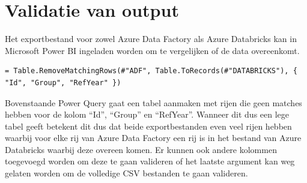 \section{Validatie van output}

Het exportbestand voor zowel Azure Data Factory als Azure Databricks kan in Microsoft Power BI ingeladen worden om te vergelijken of de data overeenkomt. 

\begin{lstlisting}[language={}, caption={Power Query voor het valideren van de output CSV bestanden.}, style=myStyle]
= Table.RemoveMatchingRows(#"ADF", Table.ToRecords(#"DATABRICKS"), { "Id", "Group", "RefYear" })
\end{lstlisting}

Bovenstaande Power Query gaat een tabel aanmaken met rijen die geen matches hebben voor de kolom ``Id'', ``Group'' en ``RefYear''. Wanneer dit dus een lege tabel geeft betekent dit dus dat beide exportbestanden even veel rijen hebben waarbij voor elke rij van Azure Data Factory een rij is in het bestand van Azure Databricks waarbij deze overeen komen. Er kunnen ook andere kolommen toegevoegd worden om deze te gaan valideren of het laatste argument kan weg gelaten worden om de volledige CSV bestanden te gaan valideren.